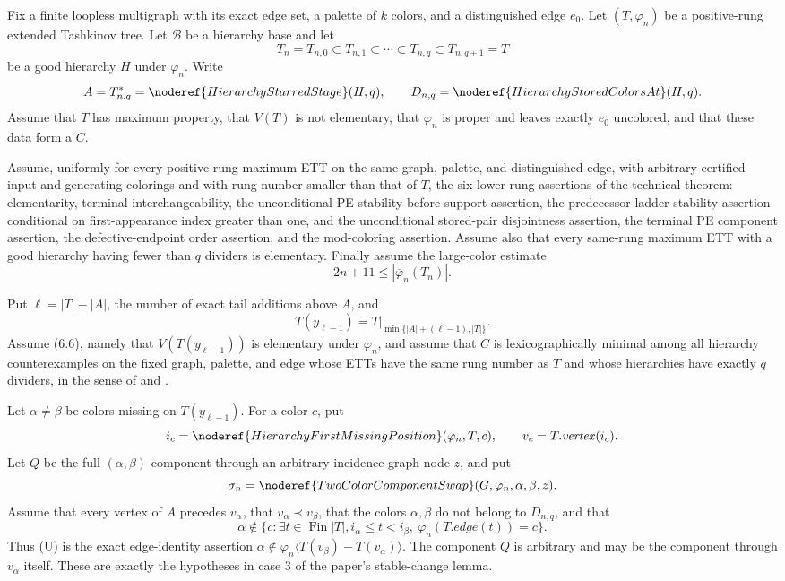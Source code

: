 \begin{lemma}
Fix a finite loopless multigraph with its exact edge set, a palette of
$k$ colors, and a distinguished edge $e_0$.  Let $(T,\varphi_n)$ be a
positive-rung extended Tashkinov tree.  Let $\mathcal B$ be a hierarchy
base and let
\[
 T_n=T_{n,0}\subset T_{n,1}\subset\cdots\subset
 T_{n,q}\subset T_{n,q+1}=T
\]
be a good hierarchy $H$ under $\varphi_n$.  Write
\[
 A=T_{n,q}^{*}=\noderef{HierarchyStarredStage}(H,q),\qquad
 D_{n,q}=\noderef{HierarchyStoredColorsAt}(H,q).
\]
Assume that $T$ has maximum property, that $V(T)$ is not elementary,
that $\varphi_n$ is proper and leaves exactly $e_0$ uncolored, and that
these data form a  $C$.

Assume, uniformly for every positive-rung maximum ETT on the same
graph, palette, and distinguished edge, with arbitrary certified input
and generating colorings and with rung number smaller than that of $T$,
the six lower-rung assertions of the technical theorem: elementarity,
terminal interchangeability, the unconditional PE stability-before-support
assertion, the predecessor-ladder stability assertion conditional on
first-appearance index greater than one, and the unconditional stored-pair
disjointness assertion, the terminal PE component assertion, the defective-endpoint
order assertion, and the mod-coloring assertion.  Assume also that every
same-rung maximum ETT with a good hierarchy having fewer than $q$
dividers is elementary.  Finally assume the large-color estimate
\[
                 2n+11\leq |\overline\varphi_n(T_n)|.          \tag{L}
\]

Put $\ell=|T|-|A|$, the number of exact tail additions above $A$, and
\[
 T(y_{\ell-1})=T\big|_{\min\{|A|+(\ell-1),|T|\}}.
\]
Assume (6.6), namely that $V(T(y_{\ell-1}))$ is elementary under
$\varphi_n$, and assume that $C$ is lexicographically minimal among all
hierarchy counterexamples on the fixed graph, palette, and edge whose
ETTs have the same rung number as $T$ and whose hierarchies have exactly
$q$ dividers, in the sense of
 and
.

Let $\alpha\ne\beta$ be colors missing on $T(y_{\ell-1})$.  For a color
$c$, put
\[
 i_c=\noderef{HierarchyFirstMissingPosition}(\varphi_n,T,c),
 \qquad v_c=T.\mathit{vertex}(i_c).
\]
Let $Q$ be the full $(\alpha,\beta)$-component through an arbitrary
incidence-graph node $z$, and put
\[
 \sigma_n=\noderef{TwoColorComponentSwap}
       (G,\varphi_n,\alpha,\beta,z).
\]
Assume that every vertex of $A$ precedes $v_\alpha$, that
$v_\alpha\prec v_\beta$, that the colors $\alpha,\beta$ do not belong
to $D_{n,q}$, and that
\[
 \alpha\notin
 \{c:\exists t\in\operatorname{Fin}|T|,
        i_\alpha\leq t<i_\beta,
        \ \varphi_n(T.\mathit{edge}(t))=c\}.                 \tag{U}
\]
Thus (U) is the exact edge-identity assertion
$\alpha\notin\varphi_n\langle T(v_\beta)-T(v_\alpha)\rangle$.
The component $Q$ is arbitrary and may be the component through
$v_\alpha$ itself.  These are exactly the hypotheses in case 3 of the
paper's stable-change lemma.


\end{lemma}
